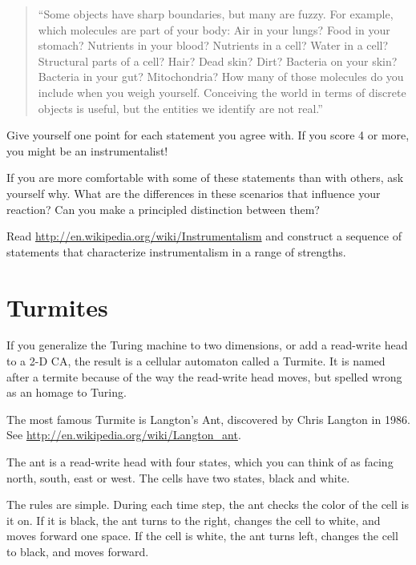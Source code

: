 \documentclass[10pt]{book}
\begin{document}
\begin{quote}
``Some objects have sharp boundaries, but many are fuzzy.  For
  example, which molecules are part of your body: Air in your lungs?
  Food in your stomach?  Nutrients in your blood?  Nutrients in a
  cell?  Water in a cell?  Structural parts of a cell?  Hair?  Dead
  skin?  Dirt?  Bacteria on your skin?  Bacteria in your gut?
  Mitochondria?  How many of those molecules do you include when you
  weigh yourself.  Conceiving the world in terms of discrete objects
  is useful, but the entities we identify are not real.''
\end{quote}

Give yourself one point for each statement you agree with.
If you score 4 or more, you might be an instrumentalist!

If you are more comfortable with some of these statements than with
others, ask yourself why.  What are the differences in these
scenarios that influence your reaction?  Can you make
a principled distinction between them?

\begin{exercise}

Read \url{http://en.wikipedia.org/wiki/Instrumentalism}
and construct a sequence
of statements that characterize instrumentalism in a range of
strengths.

\end{exercise}


\section{Turmites}

If you generalize the Turing machine to two dimensions, or
add a read-write head to a 2-D CA, the result is a
cellular automaton called a Turmite.  It is named after a
termite because of the way the read-write head moves, but
spelled wrong as an homage to Turing.

The most famous Turmite is Langton's Ant, discovered by Chris Langton
in 1986.  See \url{http://en.wikipedia.org/wiki/Langton_ant}.

The ant is a read-write head with
four states, which you can think of as facing north, south,
east or west.  The cells have two states, black and white.

The rules are simple.  During each time step, the ant checks the color
of the cell is it on.  If it is black, the ant turns to the right,
changes the cell to white, and moves forward one space.  If the cell
is white, the ant turns left, changes the cell to black, and moves
forward.
\end{document}
